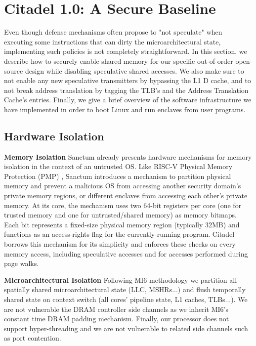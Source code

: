\section{Citadel 1.0: A Secure Baseline}

Even though defense mechanisms often propose to "not speculate" when executing some instructions that can dirty the microarchitectural state,
implementing such policies is not completely straightforward.
In this section, we describe how to securely enable shared memory for our specific out-of-order open-source design while disabling speculative shared accesses.
We also make sure to not enable any new speculative transmitters by bypassing the L1 D cache, and to not break address translation by tagging the TLB's and the Address Translation Cache's entries.
Finally, we give a brief overview of the software infrastructure we have implemented in order to boot Linux and run enclaves from user programs.

\subsection{Hardware Isolation}

\textbf{Memory Isolation}
Sanctum \cite{costan2016sanctum} already presents hardware mechanisms for memory isolation in the context of an untrusted OS.
Like RISC-V Physical Memory Protection (PMP) \cite{waterman2015risc}, Sanctum introduces a mechanism to partition physical memory and prevent a malicious OS from accessing another security domain's private memory regions, or different enclaves from accessing each other's private memory.
At its core, the mechanism uses two 64-bit registers per core (one for trusted memory and one for untrusted/shared memory) as memory bitmaps.
Each bit represents a fixed-size physical memory region (typically 32MB) and functions as an access-rights flag for the currently-running program.
Citadel borrows this mechanism for its simplicity and enforces these checks on every memory access, including speculative accesses and for accesses performed during page walks.

\noindent\textbf{Microarchitectural Isolation}
Following MI6 \cite{bourgeat2019mi6} methodology we partition all spatially shared microarchitectural state (LLC, MSHRs...) and flush temporally shared state on context switch (all cores' pipeline state, L1 caches, TLBs...).
We are not vulnerable the DRAM controller side channels as we inherit MI6's constant time DRAM padding mechanism. Finally, our processor does not support hyper-threading and we are not vulnerable to related side channels such as port contention.

